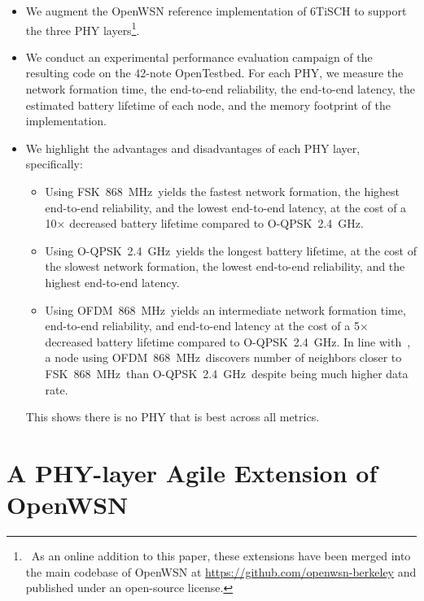 \documentclass[sensors,article,submit,moreauthors,pdftex]{Definitions/mdpi}
\newcommand{\fsk}           {FSK~868~MHz}
\newcommand{\oqpsk}         {O-QPSK~2.4~GHz}
\newcommand{\ofdm}          {OFDM~868~MHz}
\begin{document}
\begin{itemize}
    \item We augment the OpenWSN reference implementation of 6TiSCH to support the three PHY layers\footnote{~As an online addition to this paper, these extensions have been merged into the main codebase of OpenWSN at \url{https://github.com/openwsn-berkeley} and published under an open-source license.}.
    \item We conduct an experimental performance evaluation campaign of the resulting code on the 42-note OpenTestbed.
        For each PHY, we measure 
            the network formation time,
            the end-to-end reliability,
            the end-to-end latency, 
            the estimated battery lifetime of each node, and
            the memory footprint of the implementation.
    \item We highlight the advantages and disadvantages of each PHY layer, specifically:
        \begin{itemize}
            \item Using \fsk\ yields
                the fastest network formation,
                the highest end-to-end reliability, and
                the lowest end-to-end latency,
                    at the cost of
                        a 10$\times$ decreased battery lifetime compared to \oqpsk.
            \item Using \oqpsk\ yields
                the longest battery lifetime,
                    at the cost of
                        the slowest network formation,
                        the lowest end-to-end reliability, and
                        the highest end-to-end latency.
            \item Using \ofdm\ yields
                an intermediate network formation time,
                end-to-end reliability, and
                end-to-end latency
                    at the cost of
                        a 5$\times$ decreased battery lifetime compared to \oqpsk.
                In line with~\cite{munoz18evaluation}, a node using \ofdm\ discovers number of neighbors closer to \fsk\ than \oqpsk\,
                    despite being much higher data rate.
        \end{itemize}
        This shows there is no PHY that is best across all metrics.
\end{itemize}

\section{A PHY-layer Agile Extension of OpenWSN}
\label{sec:openwsn}
\end{document}
